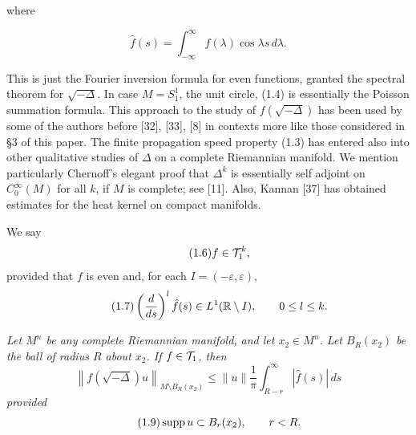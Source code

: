where

\begin{equation}\tag{1.5}
\hat f(s)=\int_{-\infty}^{\infty}f(\lambda)\cos \lambda s\,d\lambda.
\end{equation}

This is just the Fourier inversion formula for even functions, granted the
spectral theorem for $\sqrt{-\Delta}$. In case $M=S^1_1$, the unit circle, (1.4)
is essentially the Poisson summation formula. This approach to the study of
$f(\sqrt{-\Delta})$ has been used by some of the authors before [32], [33], [8] in
contexts more like those considered in \S3 of this paper. The finite propagation
speed property (1.3) has entered also into other qualitative studies of
$\Delta$ on a complete Riemannian manifold. We mention particularly Chernoff's
elegant proof that $\Delta^k$ is essentially self adjoint on $C_0^\infty(M)$ for all
$k$, if $M$ is complete; see [11]. Also, Kannan [37] has obtained estimates for
the heat kernel on compact manifolds.

\begin{definition}
\label{def:finite-propagation-class}
We say
\begin{equation}\tag{1.6}
f \in \mathcal{T}_1^k,
\end{equation}
provided that $f$ is even and, for each $I = (-\varepsilon, \varepsilon)$,
\begin{equation}\tag{1.7}
\left(\frac{d}{ds}\right)^l \hat{f}(s) \in L^1(\mathbb{R} \setminus I), \qquad 0 \leq l \leq k.
\end{equation}
\end{definition}

\begin{proposition}
\label{prop:tail-estimate}
\textit{Let $M^n$ be any complete Riemannian manifold, and let $x_2 \in M^n$.
Let $B_R(x_2)$ be the ball of radius $R$ about $x_2$. If $f \in \mathcal{T}_1$, then}
\begin{equation}\tag{1.8}
\left\| f(\sqrt{-\Delta})u \right\|_{M \setminus B_R(x_2)}
\leq \|u\| \frac{1}{\pi} \int_{R-r}^{\infty} |\hat{f}(s)|\, ds
\end{equation}
\textit{provided}
\begin{equation}\tag{1.9}
\operatorname{supp} u \subset B_r(x_2), \qquad r < R.
\end{equation}
\end{proposition}

